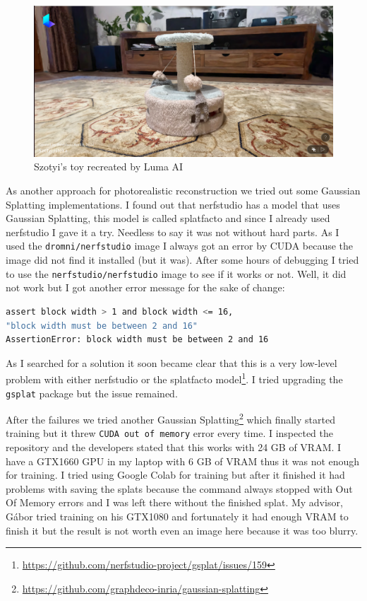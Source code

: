 \begin{figure}[H]
	\centering
	\includegraphics[width=150mm, keepaspectratio]{figures/szotyi_jateka_luma_ai.png}
	\caption{Szotyi's toy recreated by Luma AI}
	\label{fig:luma_ai_szotyi_toy}
\end{figure}

As another approach for photorealistic reconstruction we tried out some Gaussian Splatting\cite{3DGS} implementations. I found out that nerfstudio has a model that uses Gaussian Splatting, this model is called splatfacto\cite{splatfacto} and since I already used nerfstudio I gave it a try. Needless to say it was not without hard parts. As I used the \verb|dromni/nerfstudio| image I always got an error by CUDA because the image did not find it installed (but it was). After some hours of debugging I tried to use the \verb|nerfstudio/nerfstudio| image to see if it works or not. Well, it did not work but I got another error message for the sake of change:

\begin{lstlisting}[language=bash,frame=single,float=!ht]
assert block width > 1 and block width <= 16, 
"block width must be between 2 and 16"
AssertionError: block width must be between 2 and 16
\end{lstlisting}

As I searched for a solution it soon became clear that this is a very low-level problem with either nerfstudio or the splatfacto model\footnote{\url{https://github.com/nerfstudio-project/gsplat/issues/159}}. I tried upgrading the \verb|gsplat| package but the issue remained.

After the failures we tried another Gaussian Splatting\footnote{\url{https://github.com/graphdeco-inria/gaussian-splatting}} which finally started training but it threw \verb|CUDA out of memory| error every time. I inspected the repository and the developers stated that this works with 24 GB of VRAM. I have a GTX1660 GPU in my laptop with 6 GB of VRAM thus it was not enough for training. I tried using Google Colab for training but after it finished it had problems with saving the splats because the command always stopped with Out Of Memory errors and I was left there without the finished splat. My advisor, Gábor tried training on his GTX1080 and fortunately it had enough VRAM to finish it but the result is not worth even an image here because it was too blurry.
